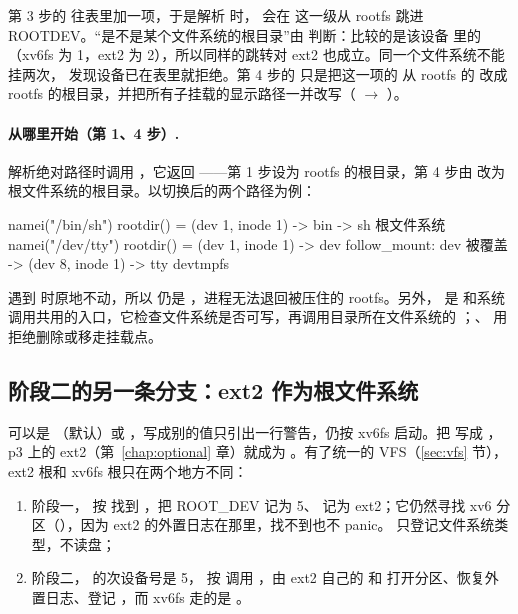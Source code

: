 第 3 步的  往表里加一项，于是解析  时， 会在  这一级从 rootfs 跳进 ROOTDEV。“是不是某个文件系统的根目录”由  判断：比较的是该设备  里的 （xv6fs 为 1，ext2 为 2），所以同样的跳转对 ext2 也成立。同一个文件系统不能挂两次， 发现设备已在表里就拒绝。第 4 步的  只是把这一项的  从 rootfs 的  改成 rootfs 的根目录，并把所有子挂载的显示路径一并改写（ $\to$ ）。

\paragraph{\code{/} 从哪里开始（第 1、4 步）.}  解析绝对路径时调用 ，它返回 ——第 1 步设为 rootfs 的根目录，第 4 步由  改为根文件系统的根目录。以切换后的两个路径为例：

\begin{txtcode}
namei("/bin/sh")    rootdir() = (dev 1, inode 1)  -> bin -> sh        根文件系统
namei("/dev/tty")   rootdir() = (dev 1, inode 1)  -> dev
                    follow_mount: dev 被覆盖 -> (dev 8, inode 1) -> tty  devtmpfs
\end{txtcode}

 遇到  时原地不动，所以  仍是 \code{/}，进程无法退回被压住的 rootfs。另外， 是  和系统调用共用的入口，它检查文件系统是否可写，再调用目录所在文件系统的 ；、 用  拒绝删除或移走挂载点。

\subsection{阶段二的另一条分支：ext2 作为根文件系统}
\label{sec:ext2-root}

 可以是 （默认）或 ，写成别的值只引出一行警告，仍按 xv6fs 启动。把  写成 ，p3 上的 ext2（第~\ref{chap:optional} 章）就成为 \code{/}。有了统一的 VFS（\ref{sec:vfs} 节），ext2 根和 xv6fs 根只在两个地方不同：

\begin{enumerate}
  \item 阶段一， 按  找到 ，把 ROOT\_DEV 记为 5、 记为 ext2；它仍然寻找 xv6 分区（），因为 ext2 的外置日志在那里，找不到也不 panic。 只登记文件系统类型，不读盘；
  \item 阶段二， 的次设备号是 5， 按  调用 ，由 ext2 自己的  和  打开分区、恢复外置日志、登记 ，而 xv6fs 走的是 。
\end{enumerate}

